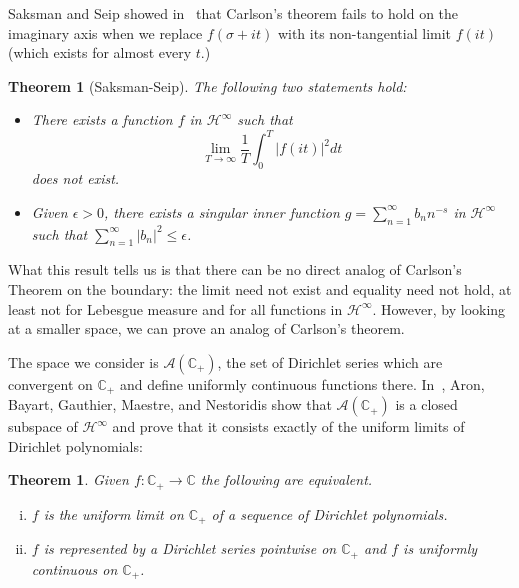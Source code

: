 \documentclass[]{elsarticle}
\newcommand{\C}{\mathbb{C}}
\newcommand{\ch}{\mathcal{H}}
\newcommand{\cA}{\mathcal{A}}
\newcommand{\cplus}{\mathbb{C}_{+}}
\numberwithin{equation}{section}
\newtheorem{thm}[prop]{Theorem}
\begin{document}
  Saksman and Seip showed in~\cite{SaksmanSeip2009} that Carlson's theorem fails to hold on the imaginary axis when we replace $f(\sigma+it)$ with its non-tangential limit $f(it)$ (which exists for almost every $t$.) 
  \begin{thm}[Saksman-Seip] \label{thm:SS}
    The following two statements hold:
    \begin{itemize}
      \item[(i)] There exists a function $f$ in $\ch^\infty$ such that 
        \begin{equation*}
          \lim_{T\to \infty} \frac{1}{T} \int_0^T |f(it)|^2 dt
        \end{equation*}
        does not exist.
      \item[(ii)] Given $\epsilon>0$, there exists a singular inner function $g = \sum_{n=1}^{\infty}b_n n^{-s}$ in $\ch^\infty$ such that $\sum_{n=1}^{\infty}|b_n|^2 \leq \epsilon$.
    \end{itemize}
  \end{thm}

  What this result tells us is that there can be no direct analog of Carlson's Theorem on the boundary: the limit need not exist and equality need not hold, at least not for Lebesgue measure and for all functions in $\ch^\infty$. However, by looking at a smaller space, we can prove an analog of Carlson's theorem.

  The space we consider is $\cA(\cplus)$, the set of Dirichlet series which are convergent on $\cplus$ and define uniformly continuous functions there. In~\cite{Aron2016}, Aron, Bayart, Gauthier, Maestre, and Nestoridis show that $\cA(\cplus)$ is a closed subspace of $\ch^\infty$ and prove that it consists exactly of the uniform limits of Dirichlet polynomials: 
    \begin{thm} \label{aron}
      Given $f: \cplus \to \C$ the following are equivalent.
      \begin{enumerate}[(i)]
        \item $f$ is the uniform limit on $\cplus$ of a sequence of Dirichlet polynomials.
        \item $f$ is represented by a Dirichlet series pointwise on $\cplus$ and $f$ is uniformly continuous on $\cplus$.
       \end{enumerate}
    \end{thm}
\end{document}
